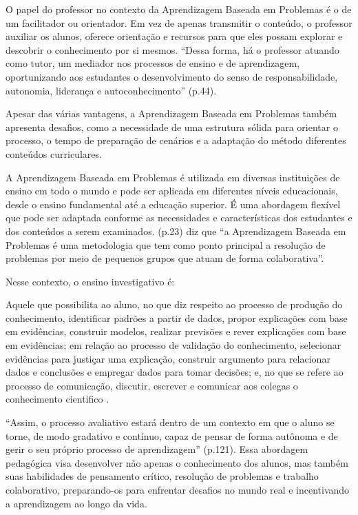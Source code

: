 O papel do professor no contexto da Aprendizagem Baseada em Problemas é o de um facilitador ou orientador. Em vez de apenas transmitir o conteúdo, o professor auxiliar os alunos, oferece orientação e recursos para que eles possam explorar e descobrir o conhecimento por si mesmos. ``Dessa forma, há o professor atuando como tutor, um mediador nos processos de ensino e de aprendizagem, oportunizando aos estudantes o desenvolvimento do senso de responsabilidade, autonomia, liderança e autoconhecimento'' \cite{NUNES2022} (p.44).

Apesar das várias vantagens, a Aprendizagem Baseada em Problemas também apresenta desafios, como a necessidade de uma estrutura sólida para orientar o processo, o tempo de preparação de cenários e a adaptação do método diferentes conteúdos curriculares.

A Aprendizagem Baseada em Problemas é utilizada em diversas instituições de ensino em todo o mundo e pode ser aplicada em diferentes níveis educacionais, desde o ensino fundamental até a educação superior. É uma abordagem flexível que pode ser adaptada conforme as necessidades e características dos estudantes e dos conteúdos a serem examinados.  (p.23) diz que ``a Aprendizagem Baseada em Problemas é uma metodologia que tem como ponto principal a resolução de problemas por meio de pequenos grupos que atuam de forma colaborativa''.

Nesse contexto, o ensino investigativo é:

\begin{citacao}
    Aquele que possibilita ao aluno, no que diz respeito ao processo de produção do conhecimento, identificar padrões a partir de dados, propor explicações com base em evidências, construir modelos, realizar previsões e rever explicações com base em evidências; em relação ao processo de validação do conhecimento, selecionar evidências para justiçar uma explicação, construir argumento para relacionar dados e conclusões e empregar dados para tomar decisões; e, no que se refere ao processo de comunicação, discutir, escrever e comunicar aos colegas o conhecimento cientifico \cite{SCARPA-SILVA2013}.
\end{citacao}

``Assim, o processo avaliativo estará dentro de um contexto em que o aluno se torne, de modo gradativo e contínuo, capaz de pensar de forma autônoma e de gerir o seu próprio processo de aprendizagem'' \cite{CAMARGO2019} (p.121). Essa abordagem pedagógica visa desenvolver não apenas o conhecimento dos alunos, mas também suas habilidades de pensamento crítico, resolução de problemas e trabalho colaborativo, preparando-os para enfrentar desafios no mundo real e incentivando a aprendizagem ao longo da vida.

